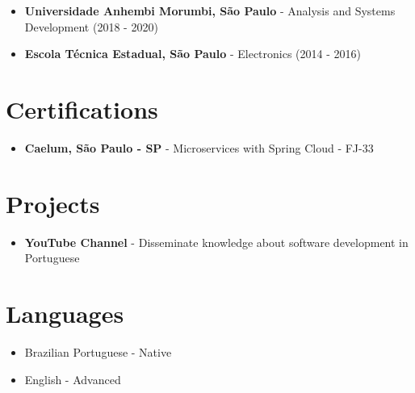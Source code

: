 \documentclass[a4paper,10pt]{article}
\begin{document}
\begin{itemize}
    \item \textbf{Universidade Anhembi Morumbi, São Paulo} - Analysis and Systems Development (2018 - 2020)
    \item \textbf{Escola Técnica Estadual, São Paulo} - Electronics (2014 - 2016)
\end{itemize}

\section*{Certifications}
\begin{itemize}
    \item \textbf{Caelum, São Paulo - SP} - Microservices with Spring Cloud - FJ-33
\end{itemize}

\section*{Projects}
\begin{itemize}
    \item \textbf{YouTube Channel} - Disseminate knowledge about software development in Portuguese
\end{itemize}

\section*{Languages}
\begin{itemize}
    \item Brazilian Portuguese - Native
    \item English - Advanced
\end{itemize}
\end{document}
